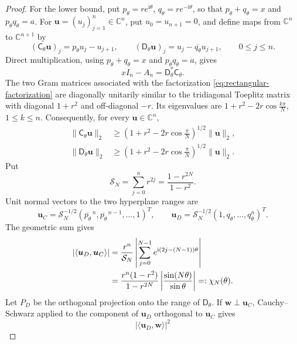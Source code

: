\documentclass[preprints,article,accept,oneauthor]{Definitions/mdpi}
\numberwithin{equation}{section}
\theoremstyle{mdpi}
\theoremstyle{definition}
\newcommand{\C}{\mathbb C}
\newcommand{\ii}{\mathrm i}
\begin{document}
\begin{proof}
For the lower bound, put
\(p_\theta=re^{\ii\theta}\), \(q_\theta=re^{-\ii\theta}\), so that
\(p_\theta+q_\theta=x\) and \(p_\theta q_\theta=a\).  For
\(\boldsymbol u=(u_j)_{j=1}^n\in\C^n\), put \(u_0=u_{n+1}=0\), and
define maps from \(\C^n\) to \(\C^{n+1}\) by
\[
 (\mathsf{C}_\theta\boldsymbol u)_j=p_\theta u_j-u_{j+1},\qquad
 (\mathsf{D}_\theta\boldsymbol u)_j=u_j-\overline{q_\theta}u_{j+1},
 \qquad0\leq j\leq n.
\]
Direct multiplication, using \(p_\theta+q_\theta=x\) and
\(p_\theta q_\theta=a\), gives
\begin{equation}\label{eq:rectangular-factorization}
 xI_n-A_n=\mathsf{D}_\theta^*\mathsf{C}_\theta.
\end{equation}
The two Gram matrices associated with the factorization
\eqref{eq:rectangular-factorization} are
diagonally unitarily similar to the tridiagonal Toeplitz matrix with
diagonal \(1+r^2\) and off-diagonal \(-r\).  Its eigenvalues are
\(1+r^2-2r\cos\frac{k\pi}{N}\), \(1\leq k\leq n\).  Consequently, for
every \(\boldsymbol u\in\C^n\),
\begin{equation}\label{eq:rectangular-min}
 \begin{aligned}
  \lVert\mathsf C_\theta\boldsymbol u\rVert_2
  &\geq \left(1+r^2-2r\cos\frac{\pi}{N}\right)^{1/2}
    \lVert\boldsymbol u\rVert_2,\\
  \lVert\mathsf D_\theta\boldsymbol u\rVert_2
  &\geq \left(1+r^2-2r\cos\frac{\pi}{N}\right)^{1/2}
    \lVert\boldsymbol u\rVert_2.
 \end{aligned}
\end{equation}
Put
\[
 \mathcal S_N=\sum_{j=0}^nr^{2j}=\frac{1-r^{2N}}{1-r^2}.
\]
Unit normal vectors to the two hyperplane ranges are
\[
 \boldsymbol u_C=\mathcal S_N^{-1/2}
 (\overline{p_\theta}^{\,n},\overline{p_\theta}^{\,n-1},\ldots,1)^T,
 \qquad
 \boldsymbol u_D=\mathcal S_N^{-1/2}(1,q_\theta,\ldots,q_\theta^n)^T.
\]
The geometric sum gives
\begin{align}
 |\langle\boldsymbol u_D,\boldsymbol u_C\rangle|
 &=\frac{r^n}{\mathcal S_N}
 \left|\sum_{j=0}^{N-1}e^{\ii(2j-(N-1))\theta}\right|\notag\\
 &=
 \frac{r^n(1-r^2)}{1-r^{2N}}
 \left|\frac{\sin(N\theta)}{\sin\theta}\right|
 =:\chi_N(\theta).
\label{eq:chi}
\end{align}
Let \(P_D\) be the orthogonal projection onto the range of
\(\mathsf D_\theta\).  If \(\boldsymbol w\perp\boldsymbol u_C\),
Cauchy--Schwarz applied to the component of \(\boldsymbol u_D\)
orthogonal to \(\boldsymbol u_C\) gives
\[
 |\langle\boldsymbol u_D,\boldsymbol w\rangle|^2
\]
\end{proof}
\end{document}

